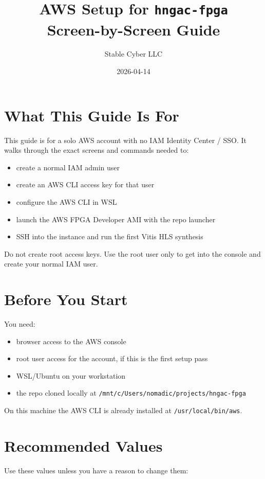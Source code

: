 \documentclass[11pt]{article}
\title{AWS Setup for \texttt{hngac-fpga}\\Screen-by-Screen Guide}
\author{Stable Cyber LLC}
\date{2026-04-14}
\begin{document}
\maketitle

\section*{What This Guide Is For}

This guide is for a solo AWS account with no IAM Identity Center / SSO. It walks through the exact screens and commands needed to:

\begin{itemize}
\item create a normal IAM admin user
\item create an AWS CLI access key for that user
\item configure the AWS CLI in WSL
\item launch the AWS FPGA Developer AMI with the repo launcher
\item SSH into the instance and run the first Vitis HLS synthesis
\end{itemize}

Do not create root access keys. Use the root user only to get into the console and create your normal IAM user.

\section*{Before You Start}

You need:

\begin{itemize}
\item browser access to the AWS console
\item root user access for the account, if this is the first setup pass
\item WSL/Ubuntu on your workstation
\item the repo cloned locally at \texttt{/mnt/c/Users/nomadic/projects/hngac-fpga}
\end{itemize}

On this machine the AWS CLI is already installed at \texttt{/usr/local/bin/aws}.

\section*{Recommended Values}

Use these values unless you have a reason to change them:
\end{document}
